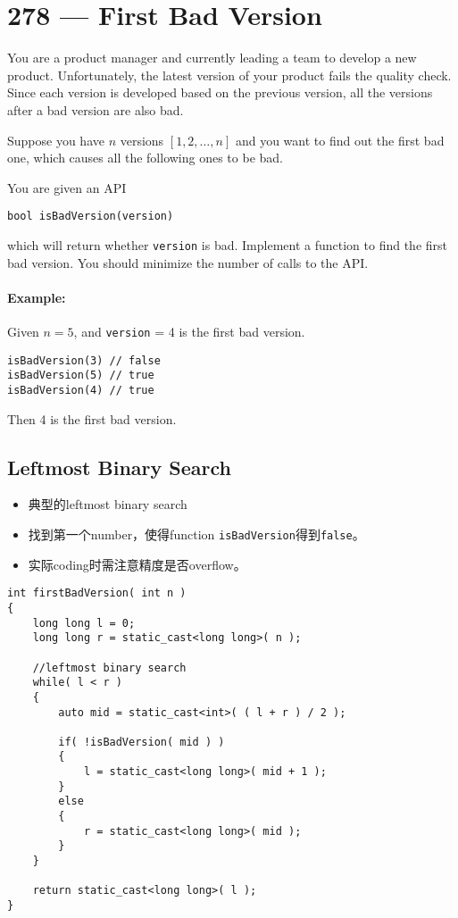 \section{278 --- First Bad Version}
You are a product manager and currently leading a team to develop a new product. Unfortunately, the latest version of your product fails the quality check. Since each version is developed based on the previous version, all the versions after a bad version are also bad.
\par
Suppose you have $n$ versions $[1, 2, \ldots, n]$ and you want to find out the first bad one, which causes all the following ones to be bad.
\par
You are given an API 
\begin{lstlisting}[style=customc]
bool isBadVersion(version)
\end{lstlisting} 

which will return whether \texttt{version} is bad. Implement a function to find the first bad version. You should minimize the number of calls to the API.

\paragraph{Example:}

Given $n = 5$, and \texttt{version} = 4 is the first bad version.

\begin{lstlisting}[style=customc]
isBadVersion(3) // false
isBadVersion(5) // true
isBadVersion(4) // true
\end{lstlisting}

Then 4 is the first bad version. 
\subsection{Leftmost Binary Search}
\begin{itemize}
\item 典型的leftmost binary search
\item 找到第一个number，使得function \texttt{isBadVersion}得到\texttt{false}。
\item 实际coding时需注意精度是否overflow。
\end{itemize}
\setcounter{lstlisting}{0}
\begin{lstlisting}[style=customc,caption={Leftmost Binary Search}]
int firstBadVersion( int n )
{
    long long l = 0;
    long long r = static_cast<long long>( n );

    //leftmost binary search
    while( l < r )
    {
        auto mid = static_cast<int>( ( l + r ) / 2 );

        if( !isBadVersion( mid ) )
        {
            l = static_cast<long long>( mid + 1 );
        }
        else
        {
            r = static_cast<long long>( mid );
        }
    }

    return static_cast<long long>( l );
}
\end{lstlisting}